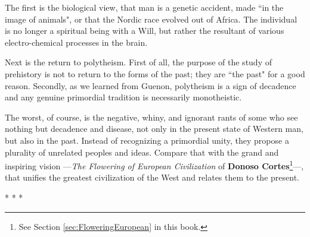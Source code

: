 The first is the biological view, that man is a genetic accident, made ``in the image of animals", or that the Nordic race evolved out of Africa. The individual is no longer a spiritual being with a Will, but rather the resultant of various electro-chemical processes in the brain. 

Next is the return to polytheism. First of all, the purpose of the study of prehistory is not to return to the forms of the past; they are ``the past" for a good reason. Secondly, as we learned from Guenon, polytheism is a sign of decadence and any genuine primordial tradition is necessarily monotheistic. 

The worst, of course, is the negative, whiny, and ignorant rants of some who see nothing but decadence and disease, not only in the present state of Western man, but also in the past. Instead of recognizing a primordial unity, they propose a plurality of unrelated peoples and ideas. Compare that with the grand and inspiring vision —\textit{The Flowering of European Civilization} of \textbf{Donoso Cortes}\footnote{See Section \ref{sec:FloweringEuropean} in this book.}—, that unifies the greatest civilization of the West and relates them to the present.




\begin{center}* * *\end{center}

